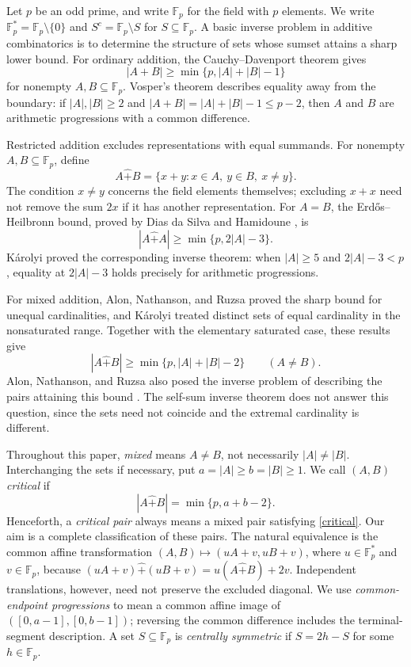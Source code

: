 \documentclass[12pt]{article}
\theoremstyle{remark}
\newcommand{\F}{\mathbb{F}_p}
\newcommand{\rs}{\mathbin{\widehat+}}
\begin{document}
Let $p$ be an odd prime, and write $\F$ for the field with $p$ elements.
We write $\F^*=\F\setminus\{0\}$ and
$S^c=\F\setminus S$ for $S\subseteq\F$.
A basic inverse problem in additive combinatorics is to determine the
structure of sets whose sumset attains a sharp lower bound.  For ordinary
addition, the Cauchy--Davenport theorem \cite{Cauchy,Davenport} gives
\[
 |A+B|\ge\min\{p,|A|+|B|-1\}
\]
for nonempty $A,B\subseteq\F$.  Vosper's theorem
\cite{Vosper1,Vosper2} describes equality away from the boundary: if
$|A|,|B|\ge2$ and $|A+B|=|A|+|B|-1\le p-2$, then $A$ and $B$ are
arithmetic progressions with a common difference.

Restricted addition excludes representations with equal summands.  For
nonempty $A,B\subseteq\F$, define
\[
 A\rs B=\{x+y:x\in A,\ y\in B,\ x\ne y\}.
\]
The condition $x\ne y$ concerns the field elements themselves; excluding
$x+x$ need not remove the sum $2x$ if it has another representation.
For $A=B$, the Erd\H{o}s--Heilbronn bound, proved by Dias da Silva and
Hamidoune \cite{DH}, is
\[
 |A\rs A|\ge\min\{p,2|A|-3\}.
\]
K\'arolyi \cite[Theorem 7]{Karolyi} proved the corresponding inverse theorem: when
$|A|\ge5$ and $2|A|-3<p$, equality at $2|A|-3$ holds precisely for
arithmetic progressions.

For mixed addition, Alon, Nathanson, and Ruzsa \cite{ANR95,ANR96}
proved the sharp bound for unequal cardinalities, and K\'arolyi
\cite{KarolyiExceptional} treated distinct sets of equal cardinality
in the nonsaturated range.  Together with the
elementary saturated case, these results give
\begin{equation}\label{anr}
 |A\rs B|\ge\min\{p,|A|+|B|-2\}\qquad(A\ne B).
\end{equation}
Alon, Nathanson, and Ruzsa also posed the inverse problem of describing
the pairs attaining this bound \cite[Section 5, item 4]{ANR96}.  The self-sum inverse theorem
does not answer this question, since the sets need not coincide and the
extremal cardinality is different.

Throughout this paper, \emph{mixed} means $A\ne B$, not necessarily
$|A|\ne|B|$.  Interchanging the sets if necessary, put
$a=|A|\ge b=|B|\ge1$.  We call $(A,B)$ \emph{critical} if
\begin{equation}\label{critical}
 |A\rs B|=\min\{p,a+b-2\}.
\end{equation}
Henceforth, a \emph{critical pair} always means a mixed pair satisfying \eqref{critical}.
Our aim is a complete classification of these pairs.  The natural
equivalence is the common affine transformation
$ (A,B)\mapsto(uA+v,uB+v)$, where $u\in\F^*$ and $v\in\F$, because
$(uA+v)\rs(uB+v)=u(A\rs B)+2v$.  Independent translations, however, need not preserve the excluded
diagonal.  We use
\emph{common-endpoint progressions} to mean a common affine image of
$([0,a-1],[0,b-1])$; reversing the common difference includes the
terminal-segment description.  A set $S\subseteq\F$ is
\emph{centrally symmetric} if $S=2h-S$ for some $h\in\F$.
\end{document}

